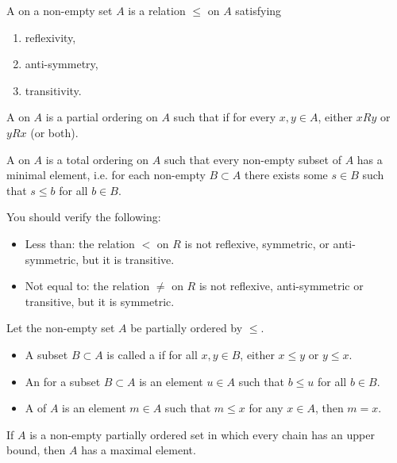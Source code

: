 \begin{definition}
A  on a non-empty set $A$ is a relation $\le$ on $A$ satisfying
\begin{enumerate}[label=(\roman*)]
\item reflexivity,
\item anti-symmetry,
\item transitivity.
\end{enumerate} 

A  on $A$ is a partial ordering on $A$ such that if for every $x, y \in A$, either $xRy$ or $yRx$ (or both).

A  on $A$ is a total ordering on $A$ such that every non-empty subset of $A$ has a minimal element, i.e. for each non-empty $B\subset A$ there exists some $s\in B$ such that $s\le b$ for all $b\in B$.
\end{definition}

\begin{example}
You should verify the following:
\begin{itemize}
\item Less than: the relation $<$ on $R$ is not reflexive, symmetric, or anti-symmetric, but it is transitive.
\item Not equal to: the relation $\neq$ on $R$ is not reflexive, anti-symmetric or transitive, but it is symmetric.
\end{itemize}
\end{example}

\begin{definition}
Let the non-empty set $A$ be partially ordered by $\le$.
\begin{itemize}
\item A subset $B\subset A$ is called a  if for all $x,y\in B$, either $x\le y$ or $y\le x$.
\item An  for a subset $B\subset A$ is an element $u\in A$ such that $b\le u$ for all $b\in B$.
\item A  of $A$ is an element $m\in A$ such that $m\le x$ for any $x\in A$, then $m=x$.
\end{itemize}
\end{definition}

\begin{lemma}
If $A$ is a non-empty partially ordered set in which every chain has an upper bound, then $A$ has a maximal element.
\end{lemma}

